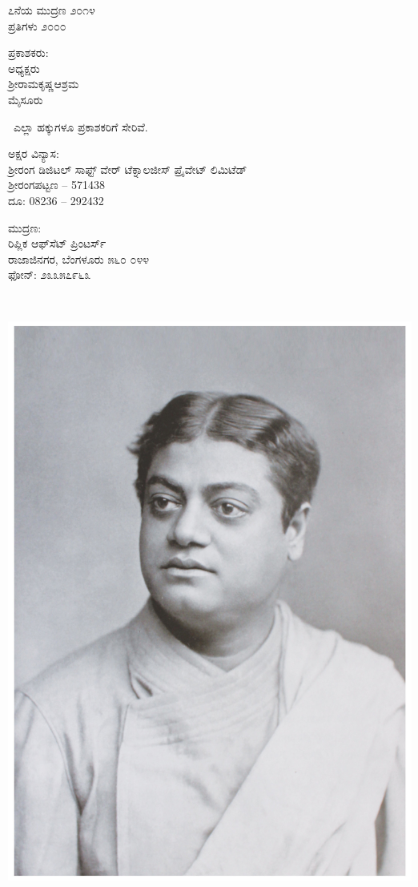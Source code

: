 \thispagestyle{empty}
\begin{flushleft}
{\fontsize{10}{12.5}\selectfont
೭ನೆಯ ಮುದ್ರಣ ೨೦೧೪‍\\
ಪ್ರತಿಗಳು ೨೦೦೦
\vfill

ಪ್ರಕಾಶಕರು:\\
ಅಧ್ಯಕ್ಷರು\\
ಶ್ರೀರಾಮಕೃಷ್ಣಆಶ್ರಮ\\
ಮೈಸೂರು
\vfill

\eng{\copyright}\ ಎಲ್ಲಾ ಹಕ್ಕುಗಳೂ ಪ್ರಕಾಶಕರಿಗೆ ಸೇರಿವೆ.
\vfill

ಅಕ್ಷರ ವಿನ್ಯಾಸ:\\ಶ‍್ರೀರಂಗ ಡಿಜಿಟಲ್ ಸಾಫ್ಟ್ ‍ವೇರ್ ಟೆಕ್ನಾಲಜೀಸ್ ಪ್ರೈವೇಟ್ ಲಿಮಿಟೆಡ್\\ಶ‍್ರೀರಂಗಪಟ್ಟಣ – 571438\\ದೂ: 08236 – 292432
\vfill

ಮುದ್ರಣ:\\
ರಿಪ್ಲಿಕ ಆಫ್​ಸೆಟ್ ಪ್ರಿಂಟರ್ಸ್\\
ರಾಜಾಜಿನಗರ, ಬೆಂಗಳೂರು ೫೬೦ ೦೪೪\\
ಫೋನ್: ೨೩೩೫೭೯೬೩
}
\end{flushleft}

\newpage
\thispagestyle{empty}

~
\vfill
\begin{center}
\includegraphics{images/SV_Pic2.jpg}
\end{center}
\vfill
\eject


